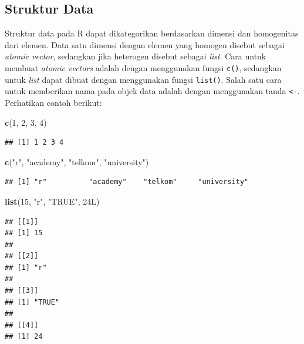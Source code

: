 \documentclass[]{article}
\newenvironment{Shaded}{\begin{snugshade}}{\end{snugshade}}
\newcommand{\DecValTok}[1]{\textcolor[rgb]{0.00,0.00,0.81}{#1}}
\newcommand{\KeywordTok}[1]{\textcolor[rgb]{0.13,0.29,0.53}{\textbf{#1}}}
\newcommand{\NormalTok}[1]{#1}
\newcommand{\StringTok}[1]{\textcolor[rgb]{0.31,0.60,0.02}{#1}}
\begin{document}
\hypertarget{struktur-data}{%
\subsection{Struktur Data}\label{struktur-data}}

Struktur data pada R dapat dikategorikan berdasarkan dimensi dan
homogenitas dari elemen. Data satu dimensi dengan elemen yang homogen
disebut sebagai \emph{atomic vector}, sedangkan jika heterogen disebut
sebagai \emph{list}. Cara untuk membuat \emph{atomic vectors} adalah
dengan menggunakan fungsi \texttt{c()}, sedangkan untuk \emph{list}
dapat dibuat dengan menggunakan fungsi \texttt{list()}. Salah satu cara
untuk memberikan nama pada objek data adalah dengan menggunakan tanda
\texttt{\textless{}-}. Perhatikan contoh berikut:

\begin{Shaded}
\begin{Highlighting}[]
\KeywordTok{c}\NormalTok{(}\DecValTok{1}\NormalTok{, }\DecValTok{2}\NormalTok{, }\DecValTok{3}\NormalTok{, }\DecValTok{4}\NormalTok{)}
\end{Highlighting}
\end{Shaded}

\begin{verbatim}
## [1] 1 2 3 4
\end{verbatim}

\begin{Shaded}
\begin{Highlighting}[]
\KeywordTok{c}\NormalTok{(}\StringTok{"r"}\NormalTok{, }\StringTok{"academy"}\NormalTok{, }\StringTok{"telkom"}\NormalTok{, }\StringTok{"university"}\NormalTok{)}
\end{Highlighting}
\end{Shaded}

\begin{verbatim}
## [1] "r"          "academy"    "telkom"     "university"
\end{verbatim}

\begin{Shaded}
\begin{Highlighting}[]
\KeywordTok{list}\NormalTok{(}\DecValTok{15}\NormalTok{, }\StringTok{"r"}\NormalTok{, }\StringTok{"TRUE"}\NormalTok{, 24L)}
\end{Highlighting}
\end{Shaded}

\begin{verbatim}
## [[1]]
## [1] 15
## 
## [[2]]
## [1] "r"
## 
## [[3]]
## [1] "TRUE"
## 
## [[4]]
## [1] 24
\end{verbatim}
\end{document}
